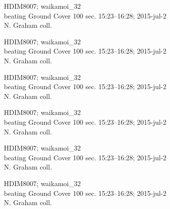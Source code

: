 \documentclass[2pt]{extarticle}
\begin{document}
\noindent
\raggedright
\parbox{0.16\textwidth}{\tiny \raggedright \rule[-0.3\baselineskip]{0pt}{10pt}HDIM8007; waikamoi\_32\\ beating Ground Cover 100 sec. 15:23--16:28; 2015-jul-2\\ N. Graham coll.}
\parbox{0.16\textwidth}{\tiny \raggedright \rule[-0.3\baselineskip]{0pt}{10pt}HDIM8007; waikamoi\_32\\ beating Ground Cover 100 sec. 15:23--16:28; 2015-jul-2\\ N. Graham coll.}
\parbox{0.16\textwidth}{\tiny \raggedright \rule[-0.3\baselineskip]{0pt}{10pt}HDIM8007; waikamoi\_32\\ beating Ground Cover 100 sec. 15:23--16:28; 2015-jul-2\\ N. Graham coll.}
\parbox{0.16\textwidth}{\tiny \raggedright \rule[-0.3\baselineskip]{0pt}{10pt}HDIM8007; waikamoi\_32\\ beating Ground Cover 100 sec. 15:23--16:28; 2015-jul-2\\ N. Graham coll.}
\parbox{0.16\textwidth}{\tiny \raggedright \rule[-0.3\baselineskip]{0pt}{10pt}HDIM8007; waikamoi\_32\\ beating Ground Cover 100 sec. 15:23--16:28; 2015-jul-2\\ N. Graham coll.}
\parbox{0.16\textwidth}{\tiny \raggedright \rule[-0.3\baselineskip]{0pt}{10pt}HDIM8007; waikamoi\_32\\ beating Ground Cover 100 sec. 15:23--16:28; 2015-jul-2\\ N. Graham coll.} \\ 
\vspace{0.001in} 
\end{document}
